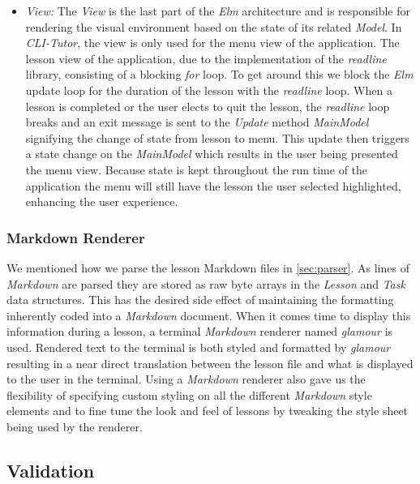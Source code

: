 \begin{itemize}
\item \textit{View:} The \textit{View} is the last part of the \textit{Elm}
    architecture and is responsible for rendering the visual environment based
    on the state of its related \textit{Model}. In \textit{CLI-Tutor}, the view
    is only used for the menu view of the application. The lesson view of the
    application, due to the implementation of the \textit{readline} library,
    consisting of a blocking \textit{for} loop. To get around this we block the
    \textit{Elm} update loop for the duration of the lesson with the
    \textit{readline} loop. When a lesson is completed or the user elects to
    quit the lesson, the \textit{readline} loop breaks and an exit message is
    sent to the \textit{Update} method \textit{MainModel} signifying the change
    of state from lesson to menu. This update then triggers a state change on
    the \textit{MainModel} which results in the user being presented the menu
    view. Because state is kept throughout the run time of the application the
    menu will still have the lesson the user selected highlighted, enhancing
    the user experience.

\end{itemize}

\subsubsection{Markdown Renderer}

We mentioned how we parse the lesson Markdown files in \autoref{sec:parser}. As
lines of \textit{Markdown} are parsed they are stored as raw byte arrays in the
\textit{Lesson} and \textit{Task} data structures. This has the desired side
effect of maintaining the formatting inherently coded into a \textit{Markdown}
document. When it comes time to display this information during a lesson, a
terminal \textit{Markdown} renderer named \textit{glamour} is used. Rendered
text to the terminal is both styled and formatted by \textit{glamour} resulting
in a near direct translation between the lesson file and what is displayed to
the user in the terminal. Using a \textit{Markdown} renderer also gave us the
flexibility of specifying custom styling on all the different \textit{Markdown}
style elements and to fine tune the look and feel of lessons by tweaking the
style sheet being used by the renderer.

\subsection{Validation}

